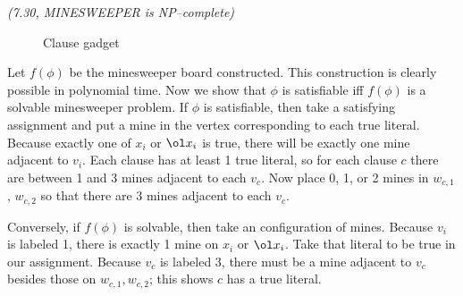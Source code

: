 \begin{problem}{\it(7.30, MINESWEEPER is NP--complete)}
\begin{figure}[h!]
\begin{center}
\end{center}
\caption{Clause gadget}
\end{figure}

Let $f(\phi)$ be the minesweeper board constructed. This construction is clearly possible in polynomial time. Now we show that $\phi$ is satisfiable iff $f(\phi)$ is a solvable minesweeper problem. If $\phi$ is satisfiable, then take a satisfying assignment and put a mine in the vertex corresponding to each true literal. Because exactly one of $x_i$ or $\ol x_i$ is true, there will be exactly one mine adjacent to $v_i$. Each clause has at least 1 true literal, so for each clause $c$ there are between 1 and 3 mines adjacent to each $v_c$. Now place 0, 1, or 2 mines in $w_{c,1}$, $w_{c,2}$ so that there are 3 mines adjacent to each $v_c$.

Conversely, if $f(\phi)$ is solvable, then take an configuration of mines. Because $v_i$ is labeled 1, there is exactly 1 mine on $x_i$ or $\ol x_i$. Take that literal to be true in our assignment. Because $v_c$ is labeled 3, there must be a mine adjacent to $v_c$ besides those on $w_{c,1},w_{c,2}$; this shows $c$ has a true literal.
\end{problem}

\pagebreak

